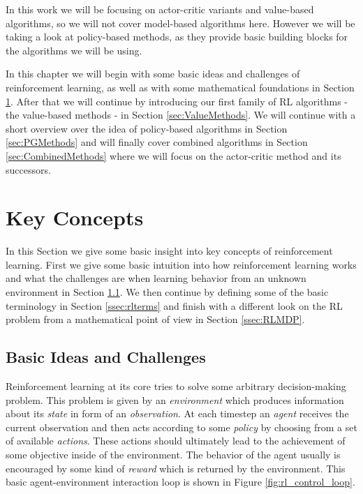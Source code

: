 In this work we will be focusing on actor-critic variants and value-based algorithms, so we will not cover model-based algorithms here. However we will be taking a look at policy-based methods, as they provide basic building blocks for the algorithms we will be using.

In this chapter we will begin with some basic ideas and challenges of reinforcement learning, as well as with some mathematical foundations in Section \ref{sec:concepts}. After that we will continue by introducing our first family of RL algorithms - the value-based methods - in Section \ref{sec:ValueMethods}. We will continue with a short overview over the idea of policy-based algorithms in Section \ref{sec:PGMethods} and will finally cover combined algorithms in Section \ref{sec:CombinedMethods} where we will focus on the actor-critic method and its successors.

\section{Key Concepts} \label{sec:concepts}
In this Section we give some basic insight into key concepts of reinforcement learning. First we give some basic intuition into how reinforcement learning works and what the challenges are when learning behavior from an unknown environment in Section \ref{ssec:rlidea}. We then continue by defining some of the basic terminology in Section \ref{ssec:rlterms} and finish with a different look on the RL problem from a mathematical point of view in Section \ref{ssec:RLMDP}.  

\subsection{Basic Ideas and Challenges} \label{ssec:rlidea}

Reinforcement learning at its core tries to solve some arbitrary decision-making problem. This problem is given by an \textit{environment} which produces information about its \textit{state} in form of an \textit{observation}. At each timestep an \textit{agent} receives the current observation and then acts according to some \textit{policy} by choosing from a set of available \textit{actions}. These actions should ultimately lead to the achievement of some objective inside of the environment. The behavior of the agent usually is encouraged by some kind of \textit{reward} which is returned by the environment. This basic agent-environment interaction loop is shown in Figure \ref{fig:rl_control_loop}.

